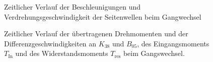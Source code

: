 \begin{figure}[h]
\centering
\newlength\aheight 
\setlength\aheight{8cm}
\newlength\awidth 
\setlength\awidth{13cm}

\caption{Zeitlicher Verlauf der Beschleunigungen und Verdrehungsgeschwindigkeit der Seitenwellen  beim Gangwechsel}
\label{fig:Gang23_Besch}
\end{figure}

\begin{figure}[h]
\centering
\newlength\bheight 
\setlength\bheight{16cm}
\newlength\bwidth 
\setlength\bwidth{13cm}

\caption{Zeitlicher Verlauf der übertragenen Drehmomenten und der Differenzgeschwindigkeiten an $K_{38}$ und $B_{05}$, des Eingangsmoments $T_{\textrm{In}}$ und des Widerstandsmoments $T_{\textrm{res}}$ beim Gangswechsel.}
\label{fig:Gang23_Tandw}
\end{figure}

\newpage
